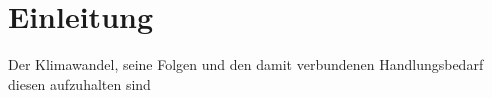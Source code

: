 \chapter{Einleitung}

Der Klimawandel, seine Folgen und den damit verbundenen Handlungsbedarf diesen aufzuhalten sind  
